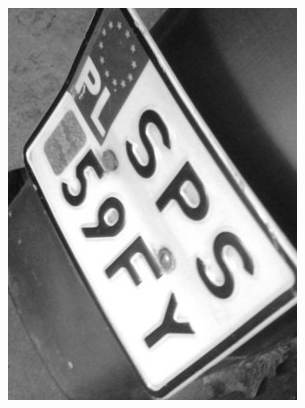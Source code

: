 \begin{figure}
  \centering
  \begin{subfigure}[b]{0.45\textwidth}
    \includegraphics[width=\textwidth]{img/detect-image-angle-input}
    \label{fig:rzut_liczba_linii_jeden}
    \caption{}
  \end{subfigure}
  ~
  \begin{subfigure}[b]{0.45\textwidth}

\end{subfigure}
\end{figure}
